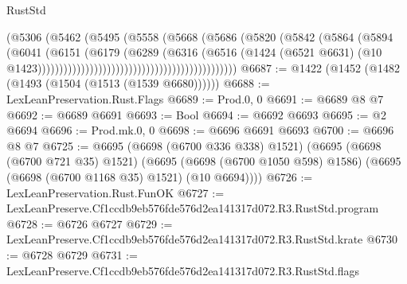 \begin{lexlean}{RustStd}
\begin{coremodule}
                                                            (@5306
                                                              (@5462
                                                                (@5495
                                                                  (@5558
                                                                    (@5668
                                                                      (@5686
                                                                        (@5820
                                                                          (@5842
                                                                            (@5864
                                                                              (@5894
                                                                                (@6041
                                                                                  (@6151
                                                                                    (@6179
                                                                                      (@6289
                                                                                        (@6316
                                                                                          (@6516
                                                                                            (@1424
                                                                                              (@6521
                                                                                                @6631)
                                                                                              (@10
                                                                                                @1423))))))))))))))))))))))))))))))))))))))))))))))
@6687 := @1422 (@1452 (@1482 (@1493 (@1504 (@1513 (@1539 @6680))))))
@6688 := LexLeanPreservation.Rust.Flags
@6689 := Prod.{0, 0}
@6691 := @6689 @8 @7
@6692 := @6689 @6691
@6693 := Bool
@6694 := @6692 @6693
@6695 := @2 @6694
@6696 := Prod.mk.{0, 0}
@6698 := @6696 @6691 @6693
@6700 := @6696 @8 @7
@6725 := @6695
    (@6698 (@6700 @336 @338) @1521)
    (@6695
      (@6698 (@6700 @721 @35) @1521)
      (@6695 (@6698 (@6700 @1050 @598) @1586) (@6695 (@6698 (@6700 @1168 @35) @1521) (@10 @6694))))
@6726 := LexLeanPreservation.Rust.FunOK
@6727 := LexLeanPreserve.Cf1ccdb9eb576fde576d2ea141317d072.R3.RustStd.program
@6728 := @6726 @6727
@6729 := LexLeanPreserve.Cf1ccdb9eb576fde576d2ea141317d072.R3.RustStd.krate
@6730 := @6728 @6729
@6731 := LexLeanPreserve.Cf1ccdb9eb576fde576d2ea141317d072.R3.RustStd.flags

\end{coremodule}
\end{lexlean}
